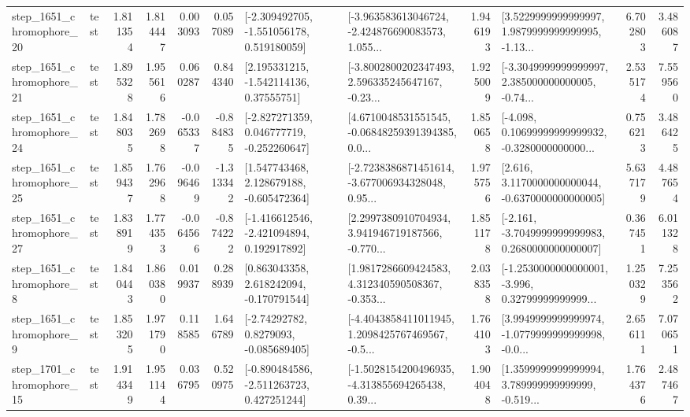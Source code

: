 \begin{tabular}{llrrrrllrlrr}
 step\_1651\_chromophore\_20 &      test &      1.811354 &    1.814447 &      0.003093 &  0.057089 &   [-2.309492705, -1.551056178, 0.519180059] &  [-3.963583613046724, -2.424876690083573, 1.055... &       1.946193 &  [3.5229999999999997, 1.9879999999999995, -1.13... &            6.702803 &          3.486087 \\
 step\_1651\_chromophore\_21 &      test &      1.895328 &    1.955616 &      0.060287 &  0.844340 &     [2.195331215, -1.542114136, 0.37555751] &  [-3.8002800202347493, 2.596335245647167, -0.23... &       1.925009 &  [-3.3049999999999997, 2.385000000000005, -0.74... &            2.535174 &          7.559560 \\
 step\_1651\_chromophore\_24 &      test &      1.848035 &    1.782698 &     -0.065337 & -0.884835 &   [-2.827271359, 0.046777719, -0.252260647] &  [4.6710048531551545, -0.06848259391394385, 0.0... &       1.850658 &  [-4.098, 0.10699999999999932, -0.3280000000000... &            0.756213 &          3.486425 \\
 step\_1651\_chromophore\_25 &      test &      1.859437 &    1.762968 &     -0.096469 & -1.313342 &    [1.547743468, 2.128679188, -0.605472364] &  [-2.7238386871451614, -3.677006934328048, 0.95... &       1.975756 &   [2.616, 3.1170000000000044, -0.6370000000000005] &            5.637179 &          4.487654 \\
 step\_1651\_chromophore\_27 &      test &      1.838919 &    1.774353 &     -0.064566 & -0.874222 &   [-1.416612546, -2.421094894, 0.192917892] &  [2.2997380910704934, 3.941946719187566, -0.770... &       1.851178 &  [-2.161, -3.7049999999999983, 0.2680000000000007] &            0.367451 &          6.011328 \\
  step\_1651\_chromophore\_8 &      test &      1.840443 &    1.860380 &      0.019937 &  0.288939 &    [0.863043358, 2.618242094, -0.170791544] &  [1.9817286609424583, 4.312340590508367, -0.353... &       2.038358 &  [-1.2530000000000001, -3.996, 0.32799999999999... &            1.250329 &          7.253562 \\
  step\_1651\_chromophore\_9 &      test &      1.853205 &    1.971790 &      0.118585 &  1.646789 &      [-2.74292782, 0.8279093, -0.085689405] &  [-4.4043858411011945, 1.2098425767469567, -0.5... &       1.764103 &  [3.9949999999999974, -1.0779999999999998, -0.0... &            2.656111 &          7.070651 \\
 step\_1701\_chromophore\_15 &      test &      1.914349 &    1.951144 &      0.036795 &  0.520975 &   [-0.890484586, -2.511263723, 0.427251244] &  [-1.5028154200496935, -4.313855694265438, 0.39... &       1.904048 &  [1.3599999999999994, 3.789999999999999, -0.519... &            1.764376 &          2.487467 \\

\end{tabular}
